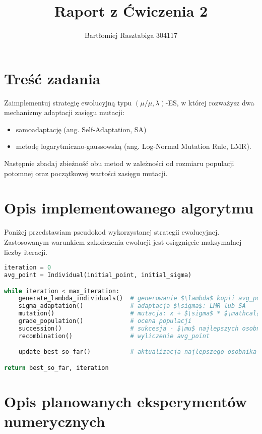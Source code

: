 \documentclass{article}
\title{Raport z Ćwiczenia 2}
\author{Bartłomiej Rasztabiga 304117}
\begin{document}
\maketitle

\section{Treść zadania}

Zaimplementuj strategię ewolucyjną typu \begin{math}(\mu/\mu, \lambda)\end{math}-ES, w której rozważysz dwa mechanizmy adaptacji zasięgu mutacji:
\begin{itemize}
  \item samoadaptację (ang. Self-Adaptation, SA)
  \item metodę logarytmiczno-gaussowską (ang. Log-Normal Mutation Rule, LMR).
\end{itemize}

Następnie zbadaj zbieżność obu metod w zależności od rozmiaru populacji potomnej oraz początkowej wartości zasięgu mutacji.

\section{Opis implementowanego algorytmu}

Poniżej przedstawiam pseudokod wykorzystanej strategii ewolucyjnej.
Zastosowanym warunkiem zakończenia ewolucji jest osiągnięcie maksymalnej liczby iteracji.

\begin{lstlisting}[language=Python,mathescape=true]
iteration = 0
avg_point = Individual(initial_point, initial_sigma)

while iteration < max_iteration:
    generate_lambda_individuals()  # generowanie $\lambda$ kopii avg_point
    sigma_adaptation()             # adaptacja $\sigma$: LMR lub SA
    mutation()                     # mutacja: x + $\sigma$ * $\mathcal{N}_{i}(0, \pmb{I}_{D})$
    grade_population()             # ocena populacji
    succession()                   # sukcesja - $\mu$ najlepszych osobnikow
    recombination()                # wyliczenie avg_point

    update_best_so_far()           # aktualizacja najlepszego osobnika

return best_so_far, iteration
\end{lstlisting}

\section{Opis planowanych eksperymentów numerycznych}
\end{document}
